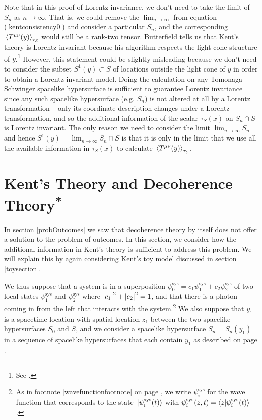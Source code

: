 Note that in this proof of Lorentz invariance, we don't need to take the limit of $S_n$ as $n\rightarrow\infty$. That is, we could remove the $\lim_{n\rightarrow\infty}$ from equation (\ref{kentconsistency0}) and consider a particular $S_n$, and the corresponding $\ev*{T^{\mu\nu}(y)}_{\tau_S}$ would still be a rank-two tensor. Butterfield tells us that Kent's theory is  Lorentz invariant because his algorithm respects the light cone structure of $y$.\footnote{See \cite[30]{Butterfield}.} However, this statement could be slightly misleading because we don't need to consider the subset $S^1(y)\subset S$ of locations outside the light cone of $y$ in order to obtain a Lorentz invariant model. Doing the calculation on any Tomonaga-Schwinger spacelike hypersurface is sufficient to guarantee Lorentz invariance since any such spacelike hypersurface (e.g. $S_n$) is not altered at all by a Lorentz transformation -- only its coordinate description changes under a Lorentz transformation, and so the additional information of the scalar $\tau_S(x)$ on $S_n\cap S$ is Lorentz invariant. The only reason we need to consider the limit $\lim_{n\rightarrow \infty}S_n$ and hence $S^1(y)=\lim_{n\rightarrow \infty}S_n\cap S$ is that it is only in the limit that we use all the available information in $\tau_S(x)$ to calculate $\ev*{T^{\mu\nu}(y)}_{\tau_S}$. 


\section{Kent's Theory\label{Kentdecoherencesection} and Decoherence Theory\textsuperscript{*}}
In section \ref{probOutcomes} we saw that decoherence theory by itself does not offer a solution to the problem of outcomes. In this section, we consider how the additional information in Kent's theory is sufficient to address this problem. We will explain this by again considering  Kent's toy model discussed in section \ref{toysection}.

We thus suppose that a system is in a superposition $\psi_0^\text{sys} = c_1\psi_1^\text{sys}+c_2\psi_2^\text{sys}$ of two local states $\psi_1^\text{sys}$ and $\psi_2^\text{sys}$ where $\abs{c_1}^2+\abs{c_2}^2=1$, and that there is a photon coming in from the left that interacts with the system.\footnote{As in footnote \ref{wavefunctionfootnote} on page \pageref{wavefunctionfootnote}, we write $\psi_i^\text{sys}$ for the wave function that corresponds to the state $\ket*{\psi_i^\text{sys}(t)}$ with $\psi_i^\text{sys}(z, t)=\ip{z}{\psi_i^\text{sys}(t)}$.} We also suppose that  $y_1$ is a spacetime location with spatial location $z_1$ between the two spacelike hypersurfaces $S_0$ and $S$, and we consider a spacelike hypersurface $S_n=S_n(y_1)$  in a sequence of spacelike hypersurfaces that each contain $y_1$ as described on page \pageref{siydef}. 

